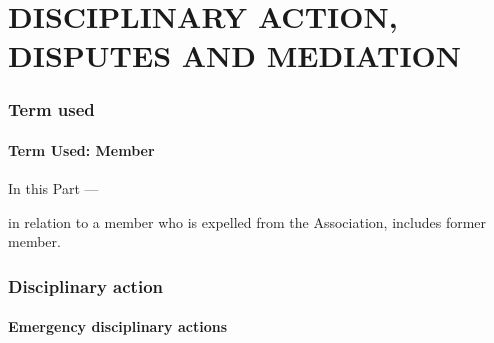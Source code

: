 \documentclass[../constitution.tex]{subfiles}
\begin{document}
\part{DISCIPLINARY ACTION, DISPUTES AND MEDIATION} \label{part-4-disciplinary-action-disputes-and-mediation}


\section{Term used} \label{division-1-term-used}

\hypertarget{term-used-member}{%
\subsection{Term Used: Member}\label{term-used-member}}

In this Part  ---

 in relation to a member who is expelled from the Association, includes former member.

\hypertarget{division-2-disciplinary-action}{%
\section{Disciplinary action}\label{division-2-disciplinary-action}}

\subsection{Emergency disciplinary actions} \label{emergency-disciplinary-actions}

\end{document}
